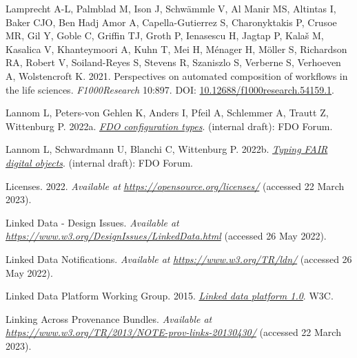\begin{CSLReferences}{1}{0}
\leavevmode{}%
Lamprecht A-L, Palmblad M, Ison J, Schwämmle V, Al Manir MS, Altintas I, Baker CJO, Ben Hadj Amor A, Capella-Gutierrez S, Charonyktakis P, Crusoe MR, Gil Y, Goble C, Griffin TJ, Groth P, Ienasescu H, Jagtap P, Kalaš M, Kasalica V, Khanteymoori A, Kuhn T, Mei H, Ménager H, Möller S, Richardson RA, Robert V, Soiland-Reyes S, Stevens R, Szaniszlo S, Verberne S, Verhoeven A, Wolstencroft K. 2021. Perspectives on automated composition of workflows in the life sciences. \emph{F1000Research} 10:897. DOI: \href{https://doi.org/10.12688/f1000research.54159.1}{10.12688/f1000research.54159.1}.

\leavevmode{}%
Lannom L, Peters-von Gehlen K, Anders I, Pfeil A, Schlemmer A, Trautt Z, Wittenburg P. 2022a. \emph{\href{https://docs.google.com/document/d/1ivvg3C_QWSO9PIQwkKT89xG4fBhNAs7_6b0Dz11EwDg/edit}{FDO configuration types}}. (internal draft): FDO Forum.

\leavevmode{}%
Lannom L, Schwardmann U, Blanchi C, Wittenburg P. 2022b. \emph{\href{https://docs.google.com/document/d/1X0hcOVIqP7iYIJf9u-7x3RwcXK8ecsauy0FZg_6-Bg0/edit}{Typing FAIR digital objects}}. (internal draft): FDO Forum.

\leavevmode{}%
Licenses. 2022. \emph{Available at} \href{https://opensource.org/licenses/}{\emph{https://opensource.org/licenses/}} (accessed 22 March 2023).

\leavevmode{}%
Linked Data - Design Issues. \emph{Available at} \href{https://www.w3.org/DesignIssues/LinkedData.html}{\emph{https://www.w3.org/DesignIssues/LinkedData.html}} (accessed 26 May 2022).

\leavevmode{}%
Linked Data Notifications. \emph{Available at} \href{https://www.w3.org/TR/ldn/}{\emph{https://www.w3.org/TR/ldn/}} (accessed 26 May 2022).

\leavevmode{}%
Linked Data Platform Working Group. 2015. \emph{\href{https://www.w3.org/TR/2015/REC-ldp-20150226/}{Linked data platform 1.0}}. W3C.

\leavevmode{}%
Linking Across Provenance Bundles. \emph{Available at} \href{https://www.w3.org/TR/2013/NOTE-prov-links-20130430/}{\emph{https://www.w3.org/TR/2013/NOTE-prov-links-20130430/}} (accessed 22 March 2023).


\end{CSLReferences}
